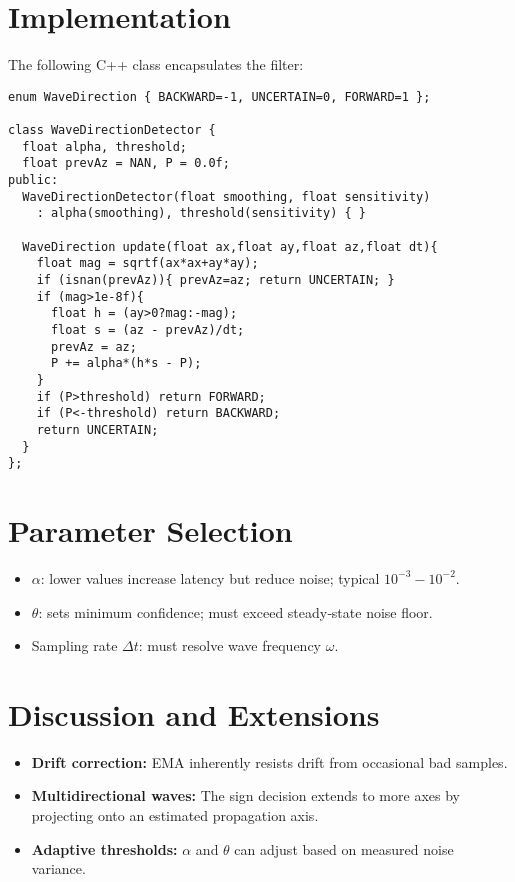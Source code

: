\documentclass[12pt,letterpaper]{article}
\begin{document}
\section{Implementation}
The following C++ class encapsulates the filter:

\begin{verbatim}
enum WaveDirection { BACKWARD=-1, UNCERTAIN=0, FORWARD=1 };

class WaveDirectionDetector {
  float alpha, threshold;
  float prevAz = NAN, P = 0.0f;
public:
  WaveDirectionDetector(float smoothing, float sensitivity)
    : alpha(smoothing), threshold(sensitivity) { }

  WaveDirection update(float ax,float ay,float az,float dt){
    float mag = sqrtf(ax*ax+ay*ay);
    if (isnan(prevAz)){ prevAz=az; return UNCERTAIN; }
    if (mag>1e-8f){
      float h = (ay>0?mag:-mag);
      float s = (az - prevAz)/dt;
      prevAz = az;
      P += alpha*(h*s - P);
    }
    if (P>threshold) return FORWARD;
    if (P<-threshold) return BACKWARD;
    return UNCERTAIN;
  }
};
\end{verbatim}

\section{Parameter Selection}
\begin{itemize}
  \item \(\alpha\): lower values increase latency but reduce noise; typical \(10^{-3}\!-\!10^{-2}\).
  \item \(\theta\): sets minimum confidence; must exceed steady‐state noise floor.
  \item Sampling rate \(\Delta t\): must resolve wave frequency \(\omega\).
\end{itemize}

\section{Discussion and Extensions}
\begin{itemize}
  \item \textbf{Drift correction:} EMA inherently resists drift from occasional bad samples.
  \item \textbf{Multidirectional waves:} The sign decision extends to more axes by projecting onto an estimated propagation axis.
  \item \textbf{Adaptive thresholds:} \(\alpha\) and \(\theta\) can adjust based on measured noise variance.
\end{itemize}
\end{document}
